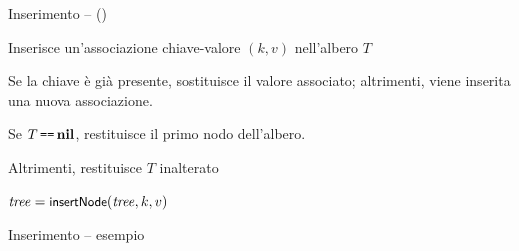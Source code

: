 \begin{frame}{Inserimento -- \insertnode() }

\vspace{-9pt}
\begin{myboxtitle}
\BIL
\item Inserisce un'associazione chiave-valore $(k,v)$ nell'albero $T$
\item Se la chiave è già presente, sostituisce il valore associato; altrimenti, viene inserita una nuova associazione. 
\item Se $T \operatorname*{\texttt{==}} \textbf{nil}$, restituisce il primo nodo dell'albero. 
\item Altrimenti, restituisce $T$ inalterato
\EIL
\end{myboxtitle}

\begin{myboxtitle}
\vspace{-12pt}
\begin{Procedure}
\caption[A]{$\textsf{insert}(\Item\ k, \Item\ v)$}
$\mathit{tree} = \textsf{{\small insertNode}}(\mathit{tree}, k, v)$\;
\end{Procedure}
\vspace{-12pt}
\end{myboxtitle}

\end{frame}

\begin{frame}{Inserimento -- esempio}


\end{frame}


